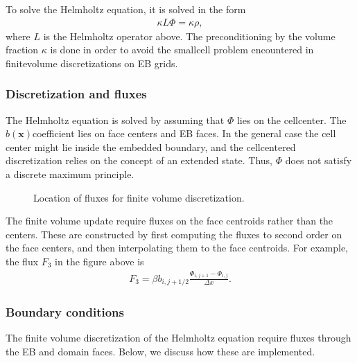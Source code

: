 \documentclass[letterpaper,10pt,english]{sphinxmanual}
\let\sphinxpxdimen\pdfpxdimen\else\newdimen\sphinxpxdimen
\begin{document}
To solve the Helmholtz equation, it is solved in the form
\begin{equation*}
\begin{split}\kappa L\Phi = \kappa\rho,\end{split}
\end{equation*}
where \(L\) is the Helmholtz operator above.
The preconditioning by the volume fraction \(\kappa\) is done in order to avoid the small\sphinxhyphen{}cell problem encountered in finite\sphinxhyphen{}volume discretizations on EB grids.


\subsubsection{Discretization and fluxes}
\label{\detokenize{Source/LinearSolvers:discretization-and-fluxes}}
The Helmholtz equation is solved by assuming that \(\Phi\) lies on the cell\sphinxhyphen{}center.
The \(b\left(\mathbf{x}\right)\)\sphinxhyphen{}coefficient lies on face centers and EB faces.
In the general case the cell center might lie inside the embedded boundary, and the cell\sphinxhyphen{}centered discretization relies on the concept of an extended state.
Thus, \(\Phi\) does not satisfy a discrete maximum principle.

\begin{figure}[htb]
\centering
\capstart

\noindent\sphinxincludegraphics[width=360\sphinxpxdimen]{{CutCell}.png}
\caption{Location of fluxes for finite volume discretization.}\label{\detokenize{Source/LinearSolvers:id1}}\label{\detokenize{Source/LinearSolvers:fig-helmholtzfluxes}}\end{figure}

The finite volume update require fluxes on the face centroids rather than the centers.
These are constructed by first computing the fluxes to second order on the face centers, and then interpolating them to the face centroids.
For example, the flux \(F_3\) in the figure above is
\begin{equation*}
\begin{split}F_3 = \beta b_{i,j+1/2}\frac{\Phi_{i,j+1} - \Phi_{i,j}}{\Delta x}.\end{split}
\end{equation*}

\subsubsection{Boundary conditions}
\label{\detokenize{Source/LinearSolvers:boundary-conditions}}
The finite volume discretization of the Helmholtz equation require fluxes through the EB and domain faces.
Below, we discuss how these are implemented.
\end{document}
